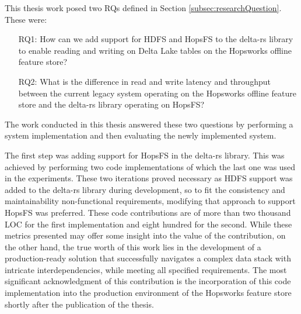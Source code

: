 This thesis work posed two \glspl{RQ} defined in Section \ref{subsec:researchQuestion}. These were: 
\begin{enumerate}
    \item[RQ1:] How can we add support for \gls{HDFS} and \gls{HopsFS} to the delta-rs library to enable reading and writing on Delta Lake tables on the Hopsworks offline feature store?
    \item[RQ2:] What is the difference in read and write latency and throughput between the current legacy system operating on the Hopsworks offline feature store and the delta-rs library operating on HopsFS?
\end{enumerate}
The work conducted in this thesis answered these two questions by performing a system implementation and then evaluating the newly implemented system. 

The first step was adding support for \gls{HopsFS} in the delta-rs library. This was achieved by performing two code implementations of which the last one was used in the experiments. These two iterations proved necessary as \gls{HDFS} support was added to the delta-rs library during development, so to fit the consistency and maintainability non-functional requirements, modifying that approach to support \gls{HopsFS} was preferred. These code contributions are of more than two thousand \gls{LOC} for the first implementation and eight hundred for the second. While these metrics presented may offer some insight into the value of the contribution, on the other hand, the true worth of this work lies in the development of a production-ready solution that successfully navigates a complex data stack with intricate interdependencies, while meeting all specified requirements. The most significant acknowledgment of this contribution is the incorporation of this code implementation into the production environment of the Hopsworks feature store shortly after the publication of the thesis.

